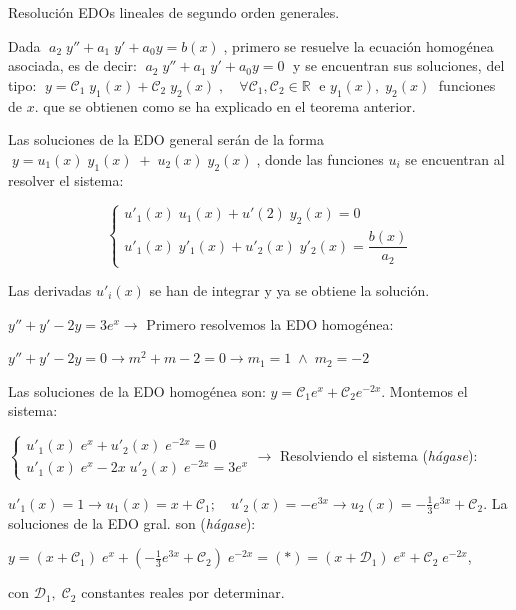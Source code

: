 \begin{teor}{Resolución EDOs lineales de segundo orden generales.}

Dada $\; a_2\; y'' + a_1	\; y' + a_0 y= b(x)\; $, primero se resuelve la ecuación homogénea asociada, es de decir: $\; a_2\; y'' + a_1	\; y' + a_0 y= 0 \; $ y se encuentran sus soluciones, del tipo: $\; y=\mathcal{C}_1\; y_1(x) +\mathcal{C}_2\; y_2(x)\; , \quad \forall \mathcal{C}_1,\mathcal{C}_2 \in \mathbb R\; $ e $y_1(x),\; y_2(x)\; $ funciones de $x$.  que se obtienen como se ha explicado en el teorema anterior.

Las soluciones de la EDO general serán de la forma $\; y= u_1(x)\; y_1(x) \; + \; u_2(x)\; y_2(x)\; $, donde las funciones $u_i$ se encuentran al resolver el sistema:

\begin{equation*}
	\begin{cases}
	u'_1(x)\; u_1(x) + u'(2)\; y_2(x)=0 \\
	u'_1(x)\; y'_1(x) + u'_2(x)\; y'_2(x)= \dfrac {b(x)}{a_2}	
	\end{cases}	
\end{equation*}

Las derivadas $u'_i(x)$ se han de integrar y ya se obtiene la solución.	
\end{teor}

\vspace{4mm}


\begin{ejem}
$y''+y'-2y=3e^x \to $ Primero resolvemos la EDO homogénea: 

$y''+y'-2y=0 \to m^2+m-2=0 \to m_1=1 \; \wedge \; m_2=-2 $

Las soluciones de la EDO homogénea son:  $y=\mathcal{C}_1 e^x + \mathcal{C}_2 e^{-2x}$. Montemos el sistema:

$\begin{cases}
u'_1(x)\; e^x + u'_2(x)\; e^{-2x}=0 \\
u'_1(x)\; e^x - 2x \; u'_2(x)\; e^{-2x}= 3e^x	
\end{cases} \to $ Resolviendo el sistema (\emph{hágase}):

$u'_1(x)=1 \to u_1(x)=x + \mathcal{C}_1 ; \quad u'_2(x)=-e^{3x} \to u_2(x)=-\frac 1 3 e^{3x}+\mathcal{C}_2$. La soluciones de la EDO gral. son (\emph{hágase}):

\hspace{20mm} $y=\left( x+\mathcal{C}_1 \right)\; e^x + \left( -\frac 1 3 e^{3x} + \mathcal{C}_2 \right) \; e^{-2x}=(*)= (x+\mathcal{D}_1) \; e^x + \mathcal{C}_2\; e^{-2x}$, 

con $\mathcal{D}_1, \; \mathcal{C}_2$ constantes reales por determinar.

	
\end{ejem}



